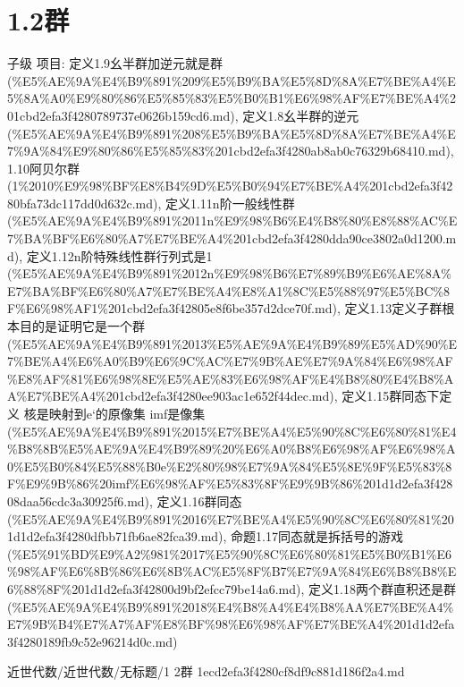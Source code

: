 \section*{1.2群}

\begin{note}[1.2群]

子级 项目: 定义1.9幺半群加逆元就是群 (\%E5\%AE\%9A\%E4\%B9\%891\%209\%E5\%B9\%BA\%E5\%8D\%8A\%E7\%BE\%A4\%E5\%8A\%A0\%E9\%80\%86\%E5\%85\%83\%E5\%B0\%B1\%E6\%98\%AF\%E7\%BE\%A4\%201cbd2efa3f4280789737e0626b159cd6.md), 定义1.8幺半群的逆元 (\%E5\%AE\%9A\%E4\%B9\%891\%208\%E5\%B9\%BA\%E5\%8D\%8A\%E7\%BE\%A4\%E7\%9A\%84\%E9\%80\%86\%E5\%85\%83\%201cbd2efa3f4280ab8ab0c76329b68410.md), 1.10阿贝尔群 (1\%2010\%E9\%98\%BF\%E8\%B4\%9D\%E5\%B0\%94\%E7\%BE\%A4\%201cbd2efa3f4280bfa73dc117dd0d632c.md), 定义1.11n阶一般线性群 (\%E5\%AE\%9A\%E4\%B9\%891\%2011n\%E9\%98\%B6\%E4\%B8\%80\%E8\%88\%AC\%E7\%BA\%BF\%E6\%80\%A7\%E7\%BE\%A4\%201cbd2efa3f4280dda90ce3802a0d1200.md), 定义1.12n阶特殊线性群行列式是1 (\%E5\%AE\%9A\%E4\%B9\%891\%2012n\%E9\%98\%B6\%E7\%89\%B9\%E6\%AE\%8A\%E7\%BA\%BF\%E6\%80\%A7\%E7\%BE\%A4\%E8\%A1\%8C\%E5\%88\%97\%E5\%BC\%8F\%E6\%98\%AF1\%201cbd2efa3f42805e8f6be357d2dce70f.md), 定义1.13定义子群根本目的是证明它是一个群 (\%E5\%AE\%9A\%E4\%B9\%891\%2013\%E5\%AE\%9A\%E4\%B9\%89\%E5\%AD\%90\%E7\%BE\%A4\%E6\%A0\%B9\%E6\%9C\%AC\%E7\%9B\%AE\%E7\%9A\%84\%E6\%98\%AF\%E8\%AF\%81\%E6\%98\%8E\%E5\%AE\%83\%E6\%98\%AF\%E4\%B8\%80\%E4\%B8\%AA\%E7\%BE\%A4\%201cbd2efa3f4280ee903ac1e652f44dec.md), 定义1.15群同态下定义 核是映射到e‘的原像集 imf是像集 (\%E5\%AE\%9A\%E4\%B9\%891\%2015\%E7\%BE\%A4\%E5\%90\%8C\%E6\%80\%81\%E4\%B8\%8B\%E5\%AE\%9A\%E4\%B9\%89\%20\%E6\%A0\%B8\%E6\%98\%AF\%E6\%98\%A0\%E5\%B0\%84\%E5\%88\%B0e\%E2\%80\%98\%E7\%9A\%84\%E5\%8E\%9F\%E5\%83\%8F\%E9\%9B\%86\%20imf\%E6\%98\%AF\%E5\%83\%8F\%E9\%9B\%86\%201d1d2efa3f42808daa56cdc3a30925f6.md), 定义1.16群同态 (\%E5\%AE\%9A\%E4\%B9\%891\%2016\%E7\%BE\%A4\%E5\%90\%8C\%E6\%80\%81\%201d1d2efa3f4280dfbb71fb6ae82fca39.md), 命题1.17同态就是拆括号的游戏 (\%E5\%91\%BD\%E9\%A2\%981\%2017\%E5\%90\%8C\%E6\%80\%81\%E5\%B0\%B1\%E6\%98\%AF\%E6\%8B\%86\%E6\%8B\%AC\%E5\%8F\%B7\%E7\%9A\%84\%E6\%B8\%B8\%E6\%88\%8F\%201d1d2efa3f42800d9bf2efcc79be14a6.md), 定义1.18两个群直积还是群 (\%E5\%AE\%9A\%E4\%B9\%891\%2018\%E4\%B8\%A4\%E4\%B8\%AA\%E7\%BE\%A4\%E7\%9B\%B4\%E7\%A7\%AF\%E8\%BF\%98\%E6\%98\%AF\%E7\%BE\%A4\%201d1d2efa3f4280189fb9c52e96214d0c.md)

\end{note}

\begin{note}[来源路径]

近世代数/近世代数/无标题/1 2群 1ecd2efa3f4280cf8df9c881d186f2a4.md

\end{note}

